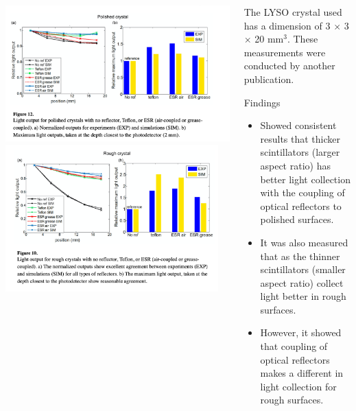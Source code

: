 \documentclass[xcolor=x11names, compress, handout]{beamer}
\renewcommand{\(}{\begin{columns}}
\renewcommand{\)}{\end{columns}}
\newcommand{\<}[1]{\begin{column}{#1}}
\renewcommand{\>}{\end{column}}
\begin{document}
\begin{frame}
\begin{columns}
\begin{column}{0.6\textwidth}
\includegraphics[width=\textwidth, height=0.49\textheight]{images/lyso_polished.png}
\includegraphics[width=0.95\textwidth, height=0.49\textheight]{images/lyso_rough.png}
\end{column}
\begin{column}{0.39\textwidth}
\scriptsize
The LYSO crystal used has a dimension of 3 $\times$ 3 $\times$ 20 mm$^3$. These measurements were conducted by another publication.\cite{roncali_stockhoff_cherry_2017}

\begin{block}{Findings}
\begin{itemize}
\item Showed consistent results that thicker scintillators (larger aspect ratio) has better light collection with the coupling of optical reflectors to polished surfaces. 
\item It was also measured that as the thinner scintillators (smaller aspect ratio) collect light better in rough surfaces. 
\item However, it showed that coupling of optical reflectors makes a different in light collection for rough surfaces. 
\end{itemize}
\end{block}
\end{column}
\end{columns}
\end{frame}
\end{document}
